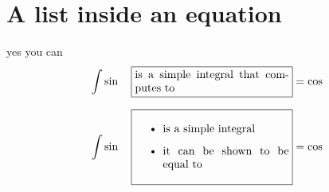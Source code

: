 \section*{A list inside an equation}%
yes you can
\begin{equation}
 \int \sin \quad \text{\fbox{\parbox{0.4\textwidth}{ is a simple integral that computes to   }}} =\cos
\end{equation}


\begin{equation}
 \int \sin \quad \text{\fbox{\parbox{0.4\textwidth}{        \begin{itemize}
       \item is a simple integral
       \item it can be shown to be equal to
       \end{itemize}
  }}} =\cos
\end{equation}



